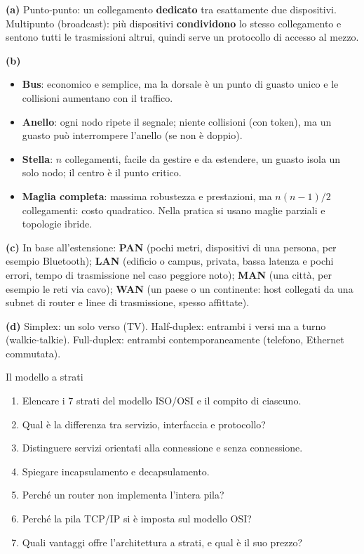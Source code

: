 \svolgimento
\textbf{(a)} Punto-punto: un collegamento \textbf{dedicato} tra esattamente due dispositivi. Multipunto (broadcast): più dispositivi
\textbf{condividono} lo stesso collegamento e sentono tutti le trasmissioni altrui, quindi serve un protocollo di accesso al mezzo.

\textbf{(b)}
\begin{itemize}
    \item \textbf{Bus}: economico e semplice, ma la dorsale è un punto di guasto unico e le collisioni aumentano con il traffico.
    \item \textbf{Anello}: ogni nodo ripete il segnale; niente collisioni (con token), ma un guasto può interrompere l'anello (se non è doppio).
    \item \textbf{Stella}: $n$ collegamenti, facile da gestire e da estendere, un guasto isola un solo nodo; il centro è il punto critico.
    \item \textbf{Maglia completa}: massima robustezza e prestazioni, ma $n(n-1)/2$ collegamenti: costo quadratico. Nella pratica si usano
          maglie parziali e topologie ibride.
\end{itemize}

\textbf{(c)} In base all'estensione: \textbf{PAN} (pochi metri, dispositivi di una persona, per esempio Bluetooth); \textbf{LAN}
(edificio o campus, privata, bassa latenza e pochi errori, tempo di trasmissione nel caso peggiore noto); \textbf{MAN} (una città, per
esempio le reti via cavo); \textbf{WAN} (un paese o un continente: host collegati da una subnet di router e linee di trasmissione, spesso
affittate).

\textbf{(d)} Simplex: un solo verso (TV). Half-duplex: entrambi i versi ma a turno (walkie-talkie). Full-duplex: entrambi
contemporaneamente (telefono, Ethernet commutata).

\begin{esercizio}{Il modello a strati}
\begin{enumerate}[label=(\alph*)]
    \item Elencare i 7 strati del modello ISO/OSI e il compito di ciascuno.
    \item Qual è la differenza tra servizio, interfaccia e protocollo?
    \item Distinguere servizi orientati alla connessione e senza connessione.
    \item Spiegare incapsulamento e decapsulamento.
    \item Perché un router non implementa l'intera pila?
    \item Perché la pila TCP/IP si è imposta sul modello OSI?
    \item Quali vantaggi offre l'architettura a strati, e qual è il suo prezzo?
\end{enumerate}
\end{esercizio}

